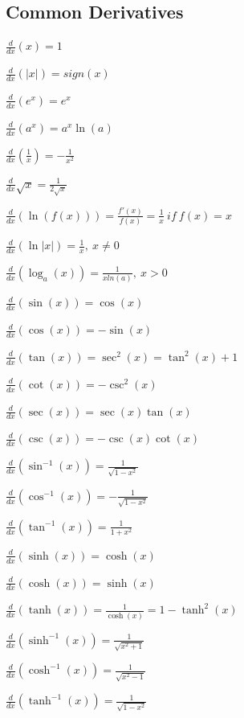 \documentclass[8pt,a4paper]{extarticle}     %
\theoremstyle{definition}
\theoremstyle{definition}
\theoremstyle{definition}
\begin{document}
\begin{multicols}{4}
\subsection{Common Derivatives}
\begin{bulletlist}
	\item $\frac{d}{dx}(x) = 1$
	\item $\frac{d}{dx}(|x|) = sign(x)$
	\item $\frac{d}{dx}(e^x) = e^x$	
	\item $\frac{d}{dx}(a^x) = a^x\ln(a)$
	\item $\frac{d}{dx}(\frac{1}{x}) = -\frac{1}{x^2}$
	\item $\frac{d}{dx}\sqrt{x} = \frac{1}{2\sqrt{x}}$
	\item $\frac{d}{dx}(\ln(f(x))) = \frac{f'(x)}{f(x)} = \frac{1}{x} \ \textit{if} \ f(x) = x$
	\item $\frac{d}{dx}(\ln|x|) = \frac{1}{x},\ x\neq0$
	\item $\frac{d}{dx}(\log_{a}(x)) = \frac{1}{xln(a)},\ x>0$
	\item $\frac{d}{dx}(\sin(x)) = \cos(x)$
	\item $\frac{d}{dx}(\cos(x)) = -\sin(x)$
	\item $\frac{d}{dx}(\tan(x)) = \sec^2(x) = \tan^2(x)+1$
	\item $\frac{d}{dx}(\cot(x)) = -\csc^2(x)$
	\item $\frac{d}{dx}(\sec(x)) = \sec(x)\tan(x)$
	\item $\frac{d}{dx}(\csc(x)) = -\csc(x)\cot(x)$
	\item $\frac{d}{dx}(\sin^{-1}(x)) = \frac{1}{\sqrt{1-x^2}}$
	\item $\frac{d}{dx}(\cos^{-1}(x)) = -\frac{1}{\sqrt{1-x^2}}$
	\item $\frac{d}{dx}(\tan^{-1}(x)) = \frac{1}{1+x^2}$
	\item $\frac{d}{dx}(\sinh(x)) = \cosh(x)$
	\item $\frac{d}{dx}(\cosh(x)) = \sinh(x)$
	\item $\frac{d}{dx}(\tanh(x)) = \frac{1}{\cosh(x)} = 1-\tanh^2(x)$
	\item $\frac{d}{dx}(\sinh^{-1}(x)) = \frac{1}{\sqrt{x^2+1}}$
	\item $\frac{d}{dx}(\cosh^{-1}(x)) = \frac{1}{\sqrt{x^2-1}}$
	\item $\frac{d}{dx}(\tanh^{-1}(x)) = \frac{1}{\sqrt{1-x^2}}$
\end{bulletlist}


\end{multicols}
\end{document}
